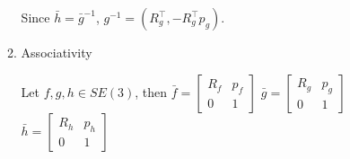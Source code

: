 \documentclass[12pt]{article}
\begin{document}
\begin{enumerate}
\begin{enumerate}
                        Since $\bar{h} = \bar{g}^{-1}$, $g^{-1} = (R_g^\top,-R_g^\top p_g  )$.
                        
                    \item Associativity 
                    
                        Let $f,g,h \in SE(3)$, then
                        $\bar{f} = \begin{bmatrix} 
                                        R_f & p_f \\ 
                                        0 & 1
                                    \end{bmatrix}$ 
                                    $\bar{g} = \begin{bmatrix} 
                                        R_g & p_g \\ 
                                        0 & 1
                                    \end{bmatrix}$ 
                                    $\bar{h} = \begin{bmatrix} 
                                        R_h & p_h \\ 
                                        0 & 1
                                    \end{bmatrix}$ 
                        

\end{enumerate}
\end{enumerate}
\end{document}

